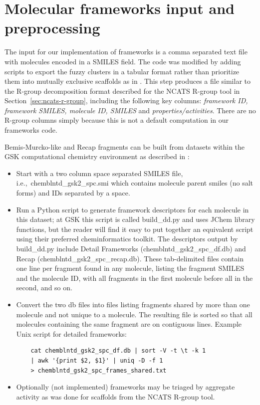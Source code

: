 \documentclass[11pt,letterpaper,biochem]{article}
\newcommand*\sref[1]{Section~\ref{sec:#1}}
\newcommand*\ie{i.e.,~}
\begin{document}
\newpage 

\section{Molecular frameworks input and preprocessing}
\label{sec:gskfw-prepro}
The input for our implementation of frameworks is a comma separated text file
with molecules encoded in a SMILES field.  The code was modified by
adding scripts to export the fuzzy clusters in a tabular format rather
than prioritize them into mutually exclusive scaffolds as in
\cite{Harper2004DDclus}. This step produces a file similar to
the R-group decomposition format described for the NCATS R-group tool
in \sref{ncats-r-group}, including the following key columns: \emph{framework
  ID, framework SMILES, molecule ID, SMILES} and
\emph{properties/activities}.  There are no R-group columns simply
because this is not a default computation in our frameworks code.

Bemis-Murcko-like and Recap fragments can be built from datasets within the GSK computational chemistry environment as described in \cite{Harper2004DDclus}:
\begin{itemize}
\item Start with a two column space separated SMILES file, \ie chemblntd\_gsk2\_spc.smi which contains molecule parent smiles (no salt forms) and IDs separated by a space. 
\item Run a Python script to generate framework descriptors for each molecule in this dataset; at GSK this script is called build\_dd.py and uses {JChem} library functions, but the reader will find it easy to put together an equivalent script using their preferred cheminformatics toolkit.  The descriptors output by build\_dd.py include Detail Frameworks (chemblntd\_gsk2\_spc\_df.db) and Recap (chemblntd\_gsk2\_spc\_recap.db). These tab-delimited files contain one line per fragment found in any molecule, listing the fragment SMILES and the molecule ID, with all fragments in the first molecule before all in the second, and so on.
\item Convert the two db files into files listing fragments shared by more than one molecule and not unique to a molecule. The resulting file is sorted so that all molecules containing the same fragment are on contiguous lines. Example Unix script for detailed frameworks:
  \begin{verbatim}
    cat chemblntd_gsk2_spc_df.db | sort -V -t \t -k 1
    | awk '{print $2, $1}' | uniq -D -f 1
    > chemblntd_gsk2_spc_frames_shared.txt
  \end{verbatim}
\item Optionally (not implemented) frameworks may be triaged by aggregate activity as was done for scaffolds from the NCATS R-group tool.   
    
\end{itemize}
\end{document}

